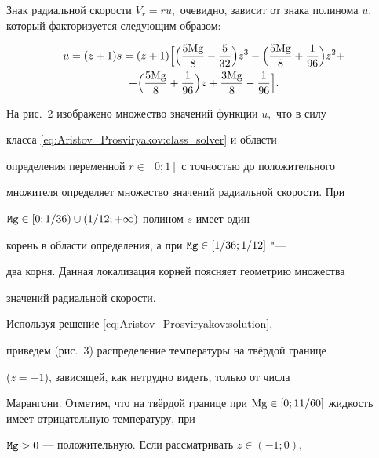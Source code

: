 Знак радиальной скорости $V_r=ru,$ очевидно, зависит от знака полинома $u,$ который факторизуется следующим образом:

\begin{multline*}

u=(z+1)s=(z+1) 




\Bigr[\Bigl(\frac{\text{5Mg}}{8}-\frac{5}{32}\Bigr)z^3-\Bigl(\frac{\text{5Mg}}{8}+\frac{1}{96}\Bigr)z^2+

\\

+

 \Bigl(\frac{\text{5Mg}}{8}+\frac{1}{96}\Bigr)z+\frac{\text{3Mg}}{8}-\frac{1}{96}\Bigr].

\end{multline*}





На рис.~2 изображено множество значений функции $u,$ что в силу

класса \eqref{eq:Aristov_Prosviryakov:class_solver} и области

определения переменной $r\in[0;1]$ с точностью до положительного

множителя определяет множество значений радиальной скорости. При

${\tt Mg}\in[0;1/36)\cup( 1/12; +\infty)$ полином $s$ имеет один

корень в области определения, а при ${\tt Mg}\in[1/36;1/12]$ "---

два корня. Данная локализация корней поясняет геометрию множества

значений радиальной скорости.







Используя решение \eqref{eq:Aristov_Prosviryakov:solution},

приведем (рис.~3) распределение температуры на твёрдой границе

($z=-1$), зависящей, как нетрудно видеть, только от числа

Марангони. Отметим, что на твёрдой границе при  ${\rm

Mg}\in[0;11/60]$ жидкость имеет отрицательную температуру, при

${\tt Mg}> 0$ --- положительную. Если рассматривать $z\in(-1;0),$

